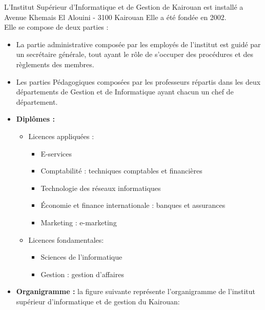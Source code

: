 \documentclass[12 pt]{report}
\begin{document}
L’Institut Supérieur d’Informatique et de Gestion de Kairouan est installé a Avenue
Khemais El Alouini - 3100 Kairouan Elle a été fondée en 2002.
\\
Elle se compose de deux parties :
\\
\begin{itemize}[font=\color{Indigo} \Large, label=]
\item La partie administrative composée par les employés de l’institut est guidé par un
secrétaire générale, tout ayant le rôle de s’occuper des procédures et des règlements des
membres. 
\item Les parties Pédagogiques composées par les professeurs répartis dans les deux
départements de Gestion et de Informatique ayant chacun un chef de département. 

\end{itemize}
\begin{itemize}[font=\color{Indigo} \Large, label=]

\item\textbf{Diplômes :}




\begin{itemize}[font=\color{Indigo} \Large, label=]
\item Licences appliquées :


\begin{itemize}[font=\color{Indigo} \Large, label=]

	\item E-services
	\item Comptabilité : techniques comptables et financières
	\item Technologie des réseaux informatiques
	\item Économie et finance internationale : banques et assurances
	\item Marketing : e-marketing

\end{itemize}
\item Licences fondamentales:
\begin{itemize}[font=\color{Indigo} \Large, label=]

\item Sciences de l'informatique
\item Gestion : gestion d'affaires
\end{itemize}
\end{itemize}
\item \textbf{Organigramme :}	
la figure suivante représente l'organigramme de l'institut supérieur d'informatique et de gestion du Kairouan:
\end{itemize}
\end{document}
